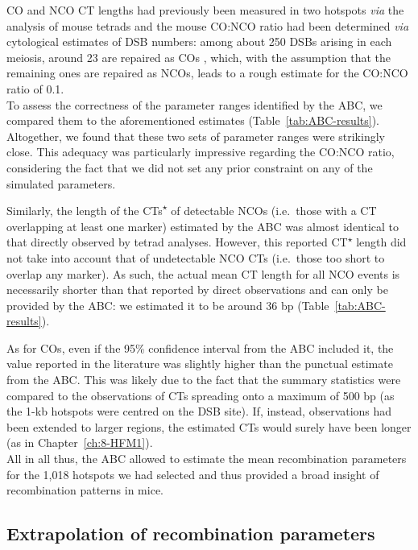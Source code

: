 CO and NCO CT lengths had previously been measured in two hotspots \textit{via} the analysis of mouse tetrads \citep{cole2014mouse} and the mouse CO:NCO ratio had been determined \textit{via} cytological estimates of DSB numbers: among about 250 DSBs arising in each meiosis, around 23 are repaired as COs \citep{baudat2007regulating, martinez-perez2009distribution}, which, with the assumption that the remaining ones are repaired as NCOs, leads to a rough estimate for the CO:NCO ratio of 0.1.\\

To assess the correctness of the parameter ranges identified by the ABC, we compared them to the aforementioned estimates (Table~\ref{tab:ABC-results}).
Altogether, we found that these two sets of parameter ranges were strikingly close.
This adequacy was particularly impressive regarding the CO:NCO ratio, considering the fact that we did not set any prior constraint on any of the simulated parameters.

Similarly, the length of the CTs\textsuperscript{$\star$} of detectable NCOs (i.e.\ those with a CT overlapping at least one marker) estimated by the ABC was almost identical to that directly observed by tetrad analyses.
However, this reported CT\textsuperscript{$\star$} length did not take into account that of undetectable NCO CTs (i.e.\ those too short to overlap any marker). As such, the actual mean CT length for all NCO events is necessarily shorter than that reported by direct observations and can only be provided by the ABC\@: we estimated it to be around 36 bp (Table~\ref{tab:ABC-results}).

As for COs, even if the 95\% confidence interval from the ABC included it, the value reported in the literature was slightly higher than the punctual estimate from the ABC\@.
This was likely due to the fact that the summary statistics were compared to the observations of CTs spreading onto a maximum of 500 bp (as the 1-kb hotspots were centred on the DSB site). 
If, instead, observations had been extended to larger regions, the estimated CTs would surely have been longer (as in Chapter~\ref{ch:8-HFM1}).\\

All in all thus, the ABC allowed to estimate the mean recombination parameters for the 1,018 hotspots we had selected and thus provided a broad insight of recombination patterns in mice.





\subsection{Extrapolation of recombination parameters}
\label{chap6:extrapolation-CO-rate}

